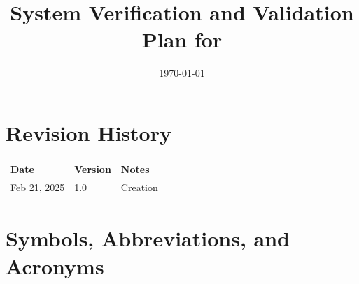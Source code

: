 \documentclass[12pt, titlepage]{article}
\begin{document}
\title{System Verification and Validation Plan for \progname{}} 
\author{\authname}
\date{\today}
	
\maketitle


\section*{Revision History}

\begin{tabularx}{\textwidth}{p{3cm}p{2cm}X} \toprule {\bf Date} & {\bf Version}
& {\bf Notes}\\
\midrule
Feb 21, 2025 & 1.0 & Creation\\
\bottomrule
\end{tabularx}



\newpage

\tableofcontents

\listoftables

\listoffigures

\newpage

\section{Symbols, Abbreviations, and Acronyms}
\end{document}
